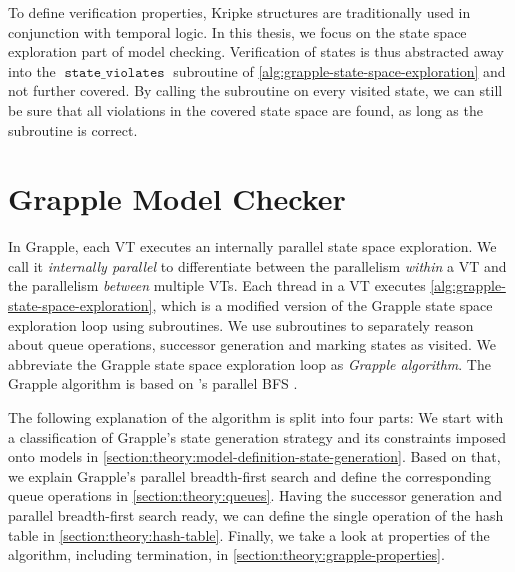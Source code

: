 \documentclass[
fancyheadings, %
%
%
]{stsreprt}
\DeclareMathOperator{\sViolates}{\texttt{state\_violates}}
\begin{document}
To define verification properties, Kripke structures are traditionally used in conjunction with temporal logic.
In this thesis, we focus on the state space exploration part of model checking.
Verification of states is thus abstracted away into the $\sViolates$ subroutine of \cref{alg:grapple-state-space-exploration} and not further covered.
By calling the subroutine on every visited state, we can still be sure that all violations in the covered state space are found, as long as the subroutine is correct.

\section{Grapple Model Checker}
\label{section:theory:grapple-model-checker}

In Grapple, each VT executes an internally parallel state space exploration.
We call it \emph{internally parallel} to differentiate between the parallelism \emph{within} a VT and the parallelism \emph{between} multiple VTs.
Each thread in a VT executes \cref{alg:grapple-state-space-exploration}, which is a modified version of the Grapple state space exploration loop \cite[Algorithm 1]{DeFrancisco2020.Grapple} using subroutines.
We use subroutines to separately reason about queue operations, successor generation and marking states as visited.
We abbreviate the Grapple state space exploration loop as \emph{Grapple algorithm}.
The Grapple algorithm is based on \citeauthor*{Holzmann2012.Paralellizing-SPIN}'s parallel BFS \cite{Holzmann2012.Paralellizing-SPIN}.

The following explanation of the algorithm is split into four parts:
We start with a classification of Grapple's state generation strategy and its constraints imposed onto models in \cref{section:theory:model-definition-state-generation}.
Based on that, we explain Grapple's parallel breadth-first search and define the corresponding queue operations in \cref{section:theory:queues}.
Having the successor generation and parallel breadth-first search ready, we can define the single operation of the hash table in \cref{section:theory:hash-table}.
Finally, we take a look at properties of the algorithm, including termination, in \cref{section:theory:grapple-properties}.
\end{document}
